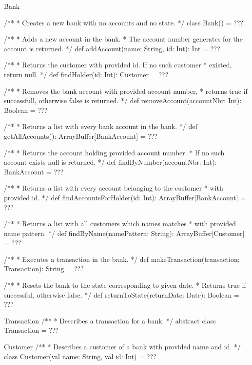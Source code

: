 \begin{ScalaSpec}{Bank}

/**
 * Creates a new bank with no accounts and no state. 
 */
class Bank() = ???

  /**
   * Adds a new account in the bank.
   * The account number generates for the account is returned.
   */
  def addAccount(name: String, id: Int): Int = ???

 /**
   * Returns the customer with provided id. If no such customer
   * existed, return null.
   */
  def findHolder(id: Int): Customer = ???

 /**
   * Removes the bank account with provided account number,
   * returns true if successfull, otherwise false is returned.
   */
  def removeAccount(accountNbr: Int): Boolean = ???

 /**
   * Returns a list with every bank account in the bank.
   */
  def getAllAccounts(): ArrayBuffer[BankAccount] = ???

  /**
   * Returns the account holding provided account number.
   * If no such account exists null is returned.
   */
  def findByNumber(accountNbr: Int): BankAccount = ???

/**
   * Returns a list with every account belonging to the customer
   * with provided id.
   */
  def findAccountsForHolder(id: Int): ArrayBuffer[BankAccount] = ???

/**
   * Returns a list with all customers which names matches
   * with provided name pattern.
   */
  def findByName(namePattern: String): ArrayBuffer[Customer] = ???

 /**
   * Executes a transaction in the bank.
   */
  def makeTransaction(transaction: Transaction): String = ???

 /**
   * Resets the bank to the state corresponding to given date.
   * Returns true if successful, otherwise false.
   */
  def returnToState(returnDate: Date): Boolean = ???


\end{ScalaSpec}


\begin{ScalaSpec}{Transaction}
/**
 * Describes a transaction for a bank.
 */
abstract class Transaction = ???

\end{ScalaSpec}


\begin{ScalaSpec}{Customer}
/**
 * Describes a customer of a bank with provided name and id.
 */
class Customer(val name: String, val id: Int) = ???

\end{ScalaSpec}


